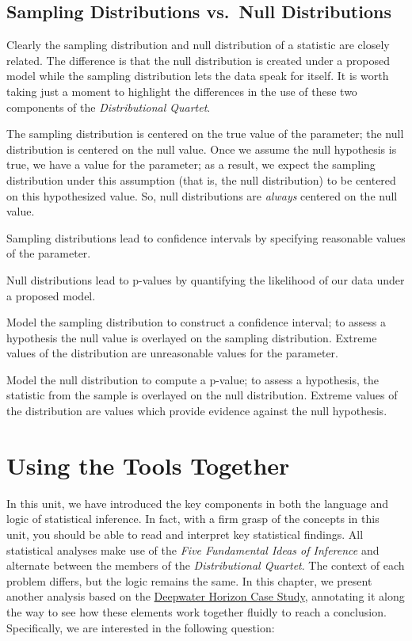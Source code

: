 \documentclass[
]{book}
\theoremstyle{plain}
\theoremstyle{mydefn}
\theoremstyle{myexmpl}
\theoremstyle{remark}
\begin{document}
\hypertarget{sampling-distributions-vs.-null-distributions}{%
\section{Sampling Distributions vs.~Null Distributions}\label{sampling-distributions-vs.-null-distributions}}

Clearly the sampling distribution and null distribution of a statistic are closely related. The difference is that the null distribution is created under a proposed model while the sampling distribution lets the data speak for itself. It is worth taking just a moment to highlight the differences in the use of these two components of the \emph{Distributional Quartet}.

The sampling distribution is centered on the true value of the parameter; the null distribution is centered on the null value. Once we assume the null hypothesis is true, we have a value for the parameter; as a result, we expect the sampling distribution under this assumption (that is, the null distribution) to be centered on this hypothesized value. So, null distributions are \emph{always} centered on the null value.

Sampling distributions lead to confidence intervals by specifying reasonable values of the parameter.

Null distributions lead to p-values by quantifying the likelihood of our data under a proposed model.

\begin{rmdtip}
Model the sampling distribution to construct a confidence interval; to assess a hypothesis the null value is overlayed on the sampling distribution. Extreme values of the distribution are unreasonable values for the parameter.

Model the null distribution to compute a p-value; to assess a hypothesis, the statistic from the sample is overlayed on the null distribution. Extreme values of the distribution are values which provide evidence against the null hypothesis.
\end{rmdtip}

\hypertarget{RecapLanguage}{%
\chapter{Using the Tools Together}\label{RecapLanguage}}

In this unit, we have introduced the key components in both the language and logic of statistical inference. In fact, with a firm grasp of the concepts in this unit, you should be able to read and interpret key statistical findings. All statistical analyses make use of the \emph{Five Fundamental Ideas of Inference} and alternate between the members of the \emph{Distributional Quartet}. The context of each problem differs, but the logic remains the same. In this chapter, we present another analysis based on the \protect\hyperlink{CaseDeepwater}{Deepwater Horizon Case Study}, annotating it along the way to see how these elements work together fluidly to reach a conclusion. Specifically, we are interested in the following question:
\end{document}
